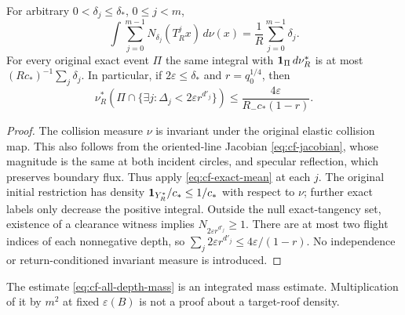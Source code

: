 \begin{corollary}
\label{cor:cf-depth-mass}
For arbitrary $0<\delta_j\le\delta_*$, $0\le j<m$,
\[
 \int\sum_{j=0}^{m-1}N_{\delta_j}(T_R^jx)\,d\nu(x)
       =\frac1R\sum_{j=0}^{m-1}\delta_j.
\]
For every original exact event $\Pi$ the same integral with
$\mathbf1_\Pi\,d\nu_R^*$ is at most
$(Rc_*)^{-1}\sum_j\delta_j$. In particular, if $2\varepsilon\le\delta_*$
and $r=q_0^{1/4}$, then
\begin{equation}\label{eq:cf-all-depth-mass}
 \nu_R^*\!\left(\Pi\cap
   \{\exists j:\Delta_j<2\varepsilon r^{d'_j}\}\right)
       \le\frac{4\varepsilon}{R_-c_*(1-r)}.
\end{equation}
\end{corollary}
\begin{proof}
The collision measure $\nu$ is invariant under the original elastic
collision map. This also follows from the oriented-line Jacobian
\eqref{eq:cf-jacobian}, whose magnitude is the same at both incident
circles, and specular reflection, which preserves boundary flux.
Thus apply \eqref{eq:cf-exact-mean} at each $j$. The original initial
restriction has density $\mathbf1_{Y_R^*}/c_*\le1/c_*$ with respect to
$\nu$; further exact labels only decrease the positive integral.
Outside the null exact-tangency set, existence of a clearance witness
implies $N_{2\varepsilon r^{d'_j}}\ge1$. There are at most two flight
indices of each nonnegative depth, so
$\sum_j2\varepsilon r^{d'_j}\le4\varepsilon/(1-r)$. No independence
or return-conditioned invariant measure is introduced.
\end{proof}
The estimate \eqref{eq:cf-all-depth-mass} is an integrated mass
estimate. Multiplication of it by $m^2$ at fixed $\varepsilon(B)$
is not a proof about a target-roof density.

